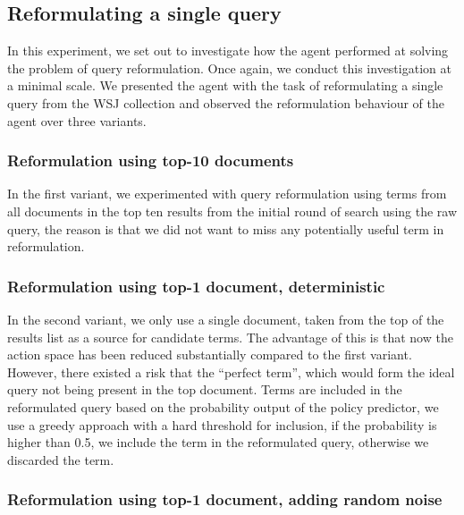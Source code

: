 \subsection{Reformulating a single query }

In this experiment, we set out to investigate how the agent performed at solving the problem of query reformulation. Once again, we conduct this investigation at a minimal scale. We presented the agent with the task of reformulating a single query from the WSJ collection and observed the reformulation behaviour of the agent over three variants.



\subsubsection{Reformulation using top-10 documents}

In the first variant, we experimented with query reformulation using terms from all documents in the top ten results from the initial round of search using the raw query, the reason is that we did not want to miss any potentially useful term in reformulation. 


\subsubsection{Reformulation using top-1 document, deterministic}

In the second variant, we only use a single document, taken from the top of the results list as a source for candidate terms. The advantage of this is that now the action space has been reduced substantially compared to the first variant. However, there existed a risk that the “perfect term”, which would form the ideal query not being present in the top document. Terms are included in the reformulated query based on the probability output of the policy predictor, we use a greedy approach with a hard threshold for inclusion, if the probability is higher than 0.5, we include the term in the reformulated query, otherwise we discarded the term. 

\subsubsection{Reformulation using top-1 document, adding random noise}

